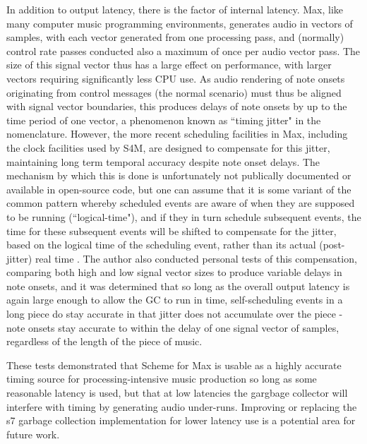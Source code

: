 \documentclass[acmsmall]{acmart}
\begin{document}
In addition to output latency, there is the factor of internal latency.
Max, like many computer music programming environments, generates audio 
in vectors of samples, with
each vector generated from one processing pass, and (normally) control
rate passes conducted also a maximum of once per audio vector pass. 
The size of this signal vector thus has a large effect on performance, with larger
vectors requiring significantly less CPU use. As audio rendering of note onsets originating
from control messages (the normal scenario) must thus be aligned with 
signal vector boundaries, this produces delays of note onsets by up to
the time period of one vector, a phenomenon known as ``timing jitter" in the nomenclature.
However, the more recent scheduling facilities in Max, including the 
clock facilities used by S4M, are designed to compensate for this jitter,
maintaining long term temporal accuracy despite note onset delays. The mechanism
by which this is done is unfortunately not publically documented or available
in open-source code, but one can assume that it is some variant of the common pattern 
whereby scheduled events are aware of when they are supposed to be running
(``logical-time"), and if they in turn schedule subsequent events, the time for these subsequent
events will be shifted to compensate for the jitter, based 
on the logical time of the scheduling event, rather than its
actual (post-jitter) real time \cite{Anderson1986}.
The author also conducted personal tests of 
this compensation, comparing both high and low signal vector sizes to produce
variable delays in note onsets, and it was determined
that so long as the overall output latency is again large enough to allow
the GC to run in time, self-scheduling events in a long piece do stay
accurate in that jitter does not accumulate over the piece - 
note onsets stay accurate to within the delay of one signal vector of samples,
regardless of the length of the piece of music.

These tests demonstrated that Scheme for Max is usable as a highly accurate
timing source for processing-intensive music production so long as some
reasonable latency is used, but that at low latencies the gargbage
collector will interfere with timing by generating audio under-runs.
Improving or replacing the s7 garbage collection implementation for 
lower latency use is a potential area for future work. 
\end{document}
